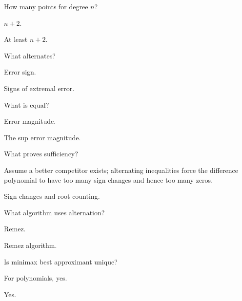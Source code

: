 \begin{exercise}\label{exr:ii23-02}
How many points for degree $n$?
\end{exercise}
\begin{hint}
$n+2$.
\end{hint}
\begin{solution}
At least $n+2$.
\end{solution}

\begin{exercise}\label{exr:ii23-03}
What alternates?
\end{exercise}
\begin{hint}
Error sign.
\end{hint}
\begin{solution}
Signs of extremal error.
\end{solution}

\begin{exercise}\label{exr:ii23-04}
What is equal?
\end{exercise}
\begin{hint}
Error magnitude.
\end{hint}
\begin{solution}
The sup error magnitude.
\end{solution}

\begin{exercise}\label{exr:ii23-05}
What proves sufficiency?
\end{exercise}
\begin{hint}
Assume a better competitor exists; alternating inequalities force the difference polynomial to have too many sign changes and hence too many zeros.
\end{hint}
\begin{solution}
Sign changes and root counting.
\end{solution}

\begin{exercise}\label{exr:ii23-06}
What algorithm uses alternation?
\end{exercise}
\begin{hint}
Remez.
\end{hint}
\begin{solution}
Remez algorithm.
\end{solution}

\begin{exercise}\label{exr:ii23-07}
Is minimax best approximant unique?
\end{exercise}
\begin{hint}
For polynomials, yes.
\end{hint}
\begin{solution}
Yes.
\end{solution}

